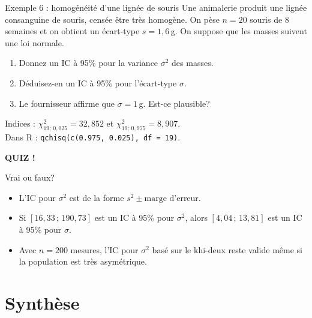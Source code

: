 \documentclass{BeamerTemplate}
\begin{document}
\begin{frame}[t]{Exemple 6 : homogénéité d'une lignée de souris}
  Une animalerie produit une lignée consanguine de souris, censée être très homogène. On pèse $n = 20$ souris de 8 semaines et on obtient un écart-type $s = 1{,}6$\,g. On suppose que les masses suivent une loi normale.

  \bigskip
  \begin{enumerate}\itemsep 5mm
    \item Donnez un IC à 95\% pour la variance $\sigma^2$ des masses.
    \item Déduisez-en un IC à 95\% pour l'écart-type $\sigma$.
    \item Le fournisseur affirme que $\sigma = 1$\,g. Est-ce plausible?
  \end{enumerate}

  \bigskip
  \small Indices : $\chi^2_{19;\,0{,}025} = 32{,}852$ et $\chi^2_{19;\,0{,}975} = 8{,}907$.\\
  Dans R : \texttt{qchisq(c(0.975, 0.025), df = 19)}.
\end{frame}

\begin{frame}[plain,t]
  \centerline{\LARGE\bfseries\alert{QUIZ !}}

  \medskip
  Vrai ou faux?
  \begin{itemize}\itemsep 1.1cm
    \item L'IC pour $\sigma^2$ est de la forme $s^2 \pm \text{marge d'erreur}$.
    \item<2-> Si $[16{,}33 \,;\, 190{,}73]$ est un IC à 95\% pour $\sigma^2$, alors $[4{,}04 \,;\, 13{,}81]$ est un IC à 95\% pour $\sigma$.
    \item<3-> Avec $n = 200$ mesures, l'IC pour $\sigma^2$ basé sur le khi-deux reste valide même si la population est très asymétrique.
  \end{itemize}
\end{frame}

\section{Synthèse}
\end{document}
